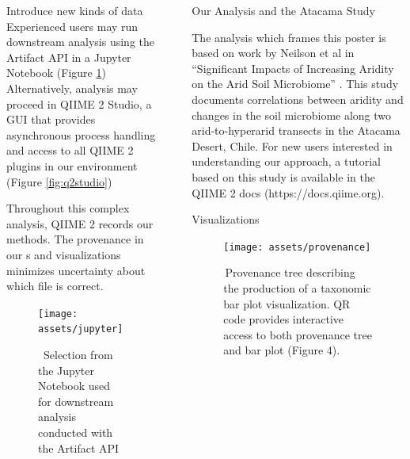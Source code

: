 \documentclass[final]{beamer}
\newlength{\sepwidth}
\newlength{\colwidth}
\newcommand{\separatorcolumn}{\begin{column}{\sepwidth}\end{column}}
\begin{document}
\begin{frame}[t]
\begin{columns}[t]
\begin{column}{\colwidth}
  \begin{block}{Introduce new kinds of data}
    Experienced users may run downstream analysis using the Artifact API in
    a Jupyter Notebook \cite{PER-GRA:2007} (Figure \ref{fig:taxabar})
    Alternatively, analysis may proceed in QIIME 2 Studio, a GUI
    that provides asynchronous process handling and access to all
    QIIME 2 plugins in our environment (Figure \ref{fig:q2studio})

    \begin{tcolorbox}
    [width=\textwidth, colframe=blue]
    {Throughout this complex analysis, QIIME 2 records our methods.
    The provenance in our s and visualizations minimizes
    uncertainty about which file is correct.}
    \end{tcolorbox}

    \begin{figure}[tph!]
      {\texttt{[image: assets/jupyter]}}
      \caption{\, Selection from the Jupyter Notebook used for downstream analysis conducted with the Artifact API}
      \label{fig:taxabar}
    \end{figure}

  \end{block}

\end{column}

\separatorcolumn

\begin{column}{\colwidth}

  \begin{block}{Our Analysis and the Atacama Study}
    \begin{tcolorbox}
    The analysis which frames this poster is based on work by Neilson et al in
    “Significant Impacts of Increasing Aridity on the Arid Soil Microbiome”
    \cite{Neilsone00195-16}. This study documents correlations between aridity
    and changes in the soil microbiome along two arid-to-hyperarid transects in
    the Atacama Desert, Chile. For new users interested in understanding
    our approach, a tutorial based on this study is available in the
    QIIME 2 docs (https://docs.qiime.org).
    \end{tcolorbox}
  \end{block}


  \begin{block}{Visualizations}
    \begin{figure}[tph!]
      {\texttt{[image: assets/provenance]}}
      \caption{\,Provenance tree describing the production of a taxonomic bar plot visualization. QR code provides interactive access to both provenance tree and bar plot (Figure 4).}
      \label{fig:provenance}
    \end{figure}


\end{block}
\end{column}
\end{columns}
\end{frame}
\end{document}
